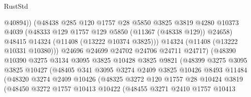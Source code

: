 \begin{lexlean}{RustStd}
\begin{coremodule}
                                @40894))
                            (@48438
                              @285
                              @120
                              @1757
                              @28
                              @5850
                              @3825
                              @3819
                              @4280
                              @10373
                              @4039
                              (@48333 @129 @1757 @129 @5850 (@11367 (@48338 @129)) @24658)
                              @48415
                              @14324
                              (@11408 (@13222 @10374 @3825)))
                            @14324
                            (@11408 (@13222 @10331 @10380)))
                          @24696
                          @24699
                          @24702
                          @24706
                          @24711
                          @24717)
                        (@48390
                          @10390
                          @3275
                          @3134
                          @3095
                          @3825
                          @10428
                          @3825
                          @9821
                          (@48399
                            @3275
                            @3095
                            @3825
                            @10427
                            (@48405
                              @341
                              @3095
                              @3274
                              @2409
                              @3825
                              @10426
                              @8493
                              @11484
                              (@48320
                                @3274
                                @2409
                                @10426
                                (@48325
                                  @3272
                                  @120
                                  @1757
                                  @28
                                  @10424
                                  @3819
                                  (@48450
                                    @3272
                                    @1757
                                    @10413
                                    @10422
                                    (@48455
                                      @3271
                                      @2410
                                      @1757
                                      @10413

\end{coremodule}
\end{lexlean}

